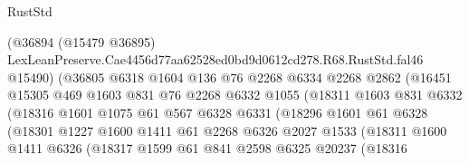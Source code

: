 \begin{lexlean}{RustStd}
\begin{coremodule}
                              (@36894
                                (@15479 @36895)
                                LexLeanPreserve.Cae4456d77aa62528ed0bd9d0612cd278.R68.RustStd.fal46
                                @15490)
                              (@36805
                                @6318
                                @1604
                                @136
                                @76
                                @2268
                                @6334
                                @2268
                                @2862
                                (@16451
                                  @15305
                                  @469
                                  @1603
                                  @831
                                  @76
                                  @2268
                                  @6332
                                  @1055
                                  (@18311
                                    @1603
                                    @831
                                    @6332
                                    (@18316
                                      @1601
                                      @1075
                                      @61
                                      @567
                                      @6328
                                      @6331
                                      (@18296
                                        @1601
                                        @61
                                        @6328
                                        (@18301
                                          @1227
                                          @1600
                                          @1411
                                          @61
                                          @2268
                                          @6326
                                          @2027
                                          @1533
                                          (@18311
                                            @1600
                                            @1411
                                            @6326
                                            (@18317
                                              @1599
                                              @61
                                              @841
                                              @2598
                                              @6325
                                              @20237
                                              (@18316

\end{coremodule}
\end{lexlean}
